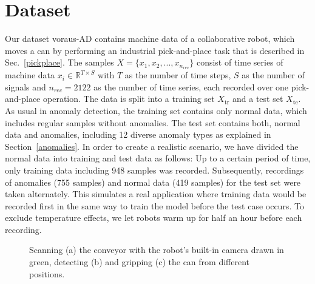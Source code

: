 \documentclass[journal]{IEEEtran}
\newcommand\datasetname{voraus-AD}
\begin{document}
\section{Dataset}
Our dataset \datasetname{} contains machine data of a collaborative robot, which moves a can by performing an industrial pick-and-place task that is described in Sec.~\ref{pickplace}.
The samples $X=\{x_1, x_2, ..., x_{n_{rec}}\}$ consist of time series of machine data $x_i \in \mathbb{R}^{T \times S}$ with $T$ as the number of time steps, $S$ as the number of signals {and $n_{rec}=2122$ as the number of time series}, each recorded over one pick-and-place operation.
The data is split into a training set $X_{\mathrm{tr}}$ and a test set $X_{\mathrm{te}}$.
As usual in anomaly detection, the training set contains only normal data, which includes regular samples without anomalies.
The test set contains both, normal data and anomalies, including 12 diverse anomaly types as explained in Section~\ref{anomalies}.
In order to create a realistic scenario, we have divided the normal data into training and test data as follows:
Up to a certain period of time, only training data including 948 samples was recorded.
Subsequently, recordings of anomalies (755 samples) and normal data (419 samples) for the test set were taken alternately.
This simulates a real application where training data would be recorded first in the same way to train the model before the test case occurs.
{To exclude temperature effects, we let robots warm up for half an hour before each recording.}

\begin{figure}
  \centering
  \newcommand\PickImgWidth{0.2}
  \caption{Scanning (a) the conveyor with the robot's built-in camera drawn in green, detecting (b) and gripping (c) the can from different positions.}
  \label{fig:object_detection}
\end{figure}
\end{document}
